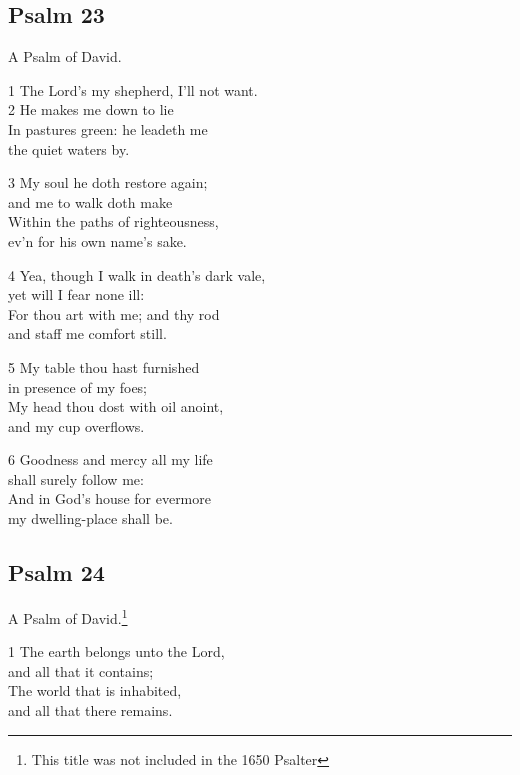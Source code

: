 \subsection*{Psalm 23 }

A Psalm of David.

1 The Lord’s my shepherd, I’ll not want.\\
2 He makes me down to lie\\
In pastures green: he leadeth me\\
the quiet waters by.

3 My soul he doth restore again;\\
and me to walk doth make\\
Within the paths of righteousness,\\
ev’n for his own name’s sake.

4 Yea, though I walk in death’s dark vale,\\
yet will I fear none ill:\\
For thou art with me; and thy rod\\
and staff me comfort still.

5 My table thou hast furnished\\
in presence of my foes;\\
My head thou dost with oil anoint,\\
and my cup overflows.

6 Goodness and mercy all my life\\
shall surely follow me:\\
And in God’s house for evermore\\
my dwelling-place shall be.

\begin{center}
\quad{}\quad{}
\end{center}

\subsection*{Psalm 24 }

A Psalm of David.\footnote{This title was not included in the 1650 Psalter}

1 The earth belongs unto the Lord,\\
and all that it contains;\\
The world that is inhabited,\\
and all that there remains.

